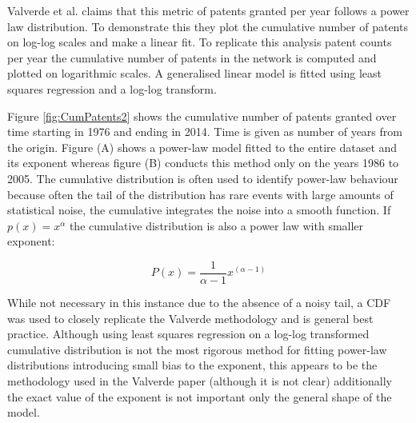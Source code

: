 Valverde et al. claims that this metric of patents granted per year follows a power law distribution. To demonstrate this they plot the cumulative number of patents on log-log scales and make a linear fit. To replicate this analysis patent counts per year the cumulative number of patents in the network is computed and plotted on logarithmic scales. A generalised linear model is fitted using least squares regression and a log-log transform. 

Figure \ref{fig:CumPatents2} shows the cumulative number of patents granted over time starting in 1976 and ending in 2014. Time is given as number of years from the origin. Figure (A) shows a power-law model fitted to the entire dataset and its exponent whereas figure (B) conducts this method only on the years 1986 to 2005. The cumulative distribution is often used to identify power-law behaviour because often the tail of the distribution has rare events with large amounts of statistical noise, the cumulative integrates the noise into a smooth function. If $ p(x) = x^{\alpha}$ the cumulative distribution is also a power law with smaller exponent:

$$ P(x) =  \frac{1}{\alpha - 1}x^{(\alpha - 1)}$$

While not necessary in this instance due to the absence of a noisy tail, a CDF was used to closely replicate the Valverde methodology and is general best practice. Although using least squares regression on a log-log transformed cumulative distribution is not the most rigorous method for fitting power-law distributions introducing small bias to the exponent, this appears to be the methodology used in the Valverde paper (although it is not clear) additionally the exact value of the exponent is not important only the general shape of the model. 


